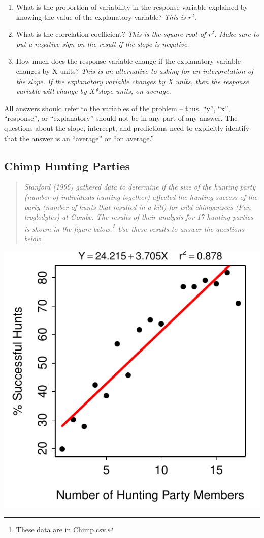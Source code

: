 \documentclass[10pt,openany]{book}\usepackage[]{graphicx}\usepackage[]{color}
\newenvironment{knitrout}{}{} %
\begin{document}
\begin{enumerate}
  \item What is the proportion of variability in the response variable explained by knowing the value of the explanatory variable?  \textit{This is $r^{2}$.}
  \item What is the correlation coefficient?  \textit{This is the square root of $r^{2}$. Make sure to put a negative sign on the result if the slope is negative.}
  \item How much does the response variable change if the explanatory variable changes by X units?  \textit{This is an alternative to asking for an interpretation of the slope. If the explanatory variable changes by X units, then the response variable will change by X*slope units, on average.}
\end{enumerate}

All answers should refer to the variables of the problem -- thus, ``y'', ``x'', ``response'', or ``explanatory'' should not be in any part of any answer. The questions about the slope, intercept, and predictions need to explicitly identify that the answer is an ``average'' or ``on average.''

\newpage
\subsection*{Chimp Hunting Parties}
\begin{quote}
\textit{Stanford (1996) gathered data to determine if the size of the hunting party (number of individuals hunting together) affected the hunting success of the party (number of hunts that resulted in a kill) for wild chimpanzees (Pan troglodytes) at Gombe. The results of their analysis for 17 hunting parties is shown in the figure below.\footnote{These data are in \href{https://raw.githubusercontent.com/droglenc/NCData/master/Chimp.csv}{Chimp.csv}.}  Use these results to answer the questions below.}
\end{quote}

\begin{knitrout}
\color{fgcolor}

{\centering \includegraphics[width=.4\linewidth]{Figs/ChimpFLP-1} 

}



\end{knitrout}
\end{document}
